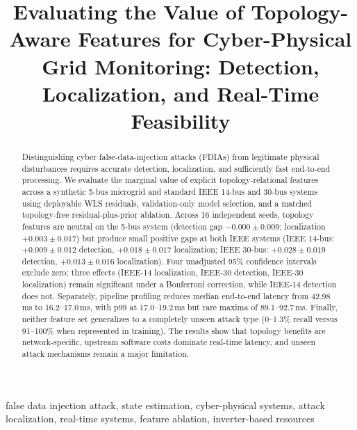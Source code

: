 \documentclass[conference]{IEEEtran}
\begin{document}
\title{Evaluating the Value of Topology-Aware Features for Cyber-Physical Grid Monitoring: Detection, Localization, and Real-Time Feasibility}

\author{
}

\maketitle

\begin{abstract}
Distinguishing cyber false-data-injection attacks (FDIAs) from legitimate physical disturbances requires accurate detection, localization, and sufficiently fast end-to-end processing. We evaluate the marginal value of explicit topology-relational features across a synthetic 5-bus microgrid and standard IEEE 14-bus and 30-bus systems using deployable WLS residuals, validation-only model selection, and a matched topology-free residual-plus-prior ablation. Across 16 independent seeds, topology features are neutral on the 5-bus system (detection gap $-0.000\pm0.009$; localization $+0.003\pm0.017$) but produce small positive gaps at both IEEE systems (IEEE 14-bus: $+0.009\pm0.012$ detection, $+0.018\pm0.017$ localization; IEEE 30-bus: $+0.028\pm0.019$ detection, $+0.013\pm0.016$ localization). Four unadjusted 95\% confidence intervals exclude zero; three effects (IEEE-14 localization, IEEE-30 detection, IEEE-30 localization) remain significant under a Bonferroni correction, while IEEE-14 detection does not. Separately, pipeline profiling reduces median end-to-end latency from 42.98\,ms to 16.2--17.0\,ms, with p99 at 17.0--19.2\,ms but rare maxima of 89.1--92.7\,ms. Finally, neither feature set generalizes to a completely unseen attack type (0--1.3\% recall versus 91--100\% when represented in training). The results show that topology benefits are network-specific, upstream software costs dominate real-time latency, and unseen attack mechanisms remain a major limitation.
\end{abstract}

\begin{IEEEkeywords}
false data injection attack, state estimation, cyber-physical systems, attack localization, real-time systems, feature ablation, inverter-based resources
\end{IEEEkeywords}
\end{document}
